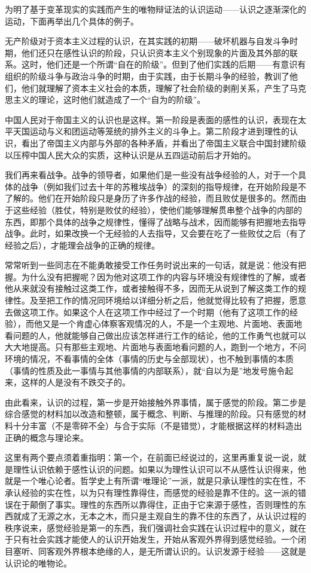 为明了基于变革现实的实践而产生的唯物辩证法的认识运动——认识之逐渐深化的运动，下面再举出几个具体的例子。

无产阶级对于资本主义过程的认识，在其实践的初期——破坏机器与自发斗争时期，他们还只在感性认识的阶段，只认识资本主义个别现象的片面及其外部的联系。这时，他们还是一个所谓“自在的阶级”。但到了他们实践的后期——有意识有组织的阶级斗争与政治斗争的时期，由于实践，由于长期斗争的经验，教训了他们，他们就理解了资本主义社会的本质，理解了社会阶级的剥削关系，产生了马克思主义的理论，这时他们就造成了一个“自为的阶级”。

中国人民对于帝国主义的认识也是这样。第一阶段是表面的感性的认识，表现在太平天国运动与义和团运动等笼统的排外主义的斗争上。第二阶段才进到理性的认识，看出了帝国主义内部与外部的各种矛盾，并看出了帝国主义联合中国封建阶级以压榨中国人民大众的实质，这种认识是从五四运动前后才开始的。

我们再来看战争。战争的领导者，如果他们是一些没有战争经验的人，对于一个具体的战争（例如我们过去十年的苏稚埃战争）的深刻的指导规律，在开始阶段是不了解的。他们在开始阶段只是身历了许多作战的经验，而且败仗是很多的。然而由于这些经验（胜仗，特别是败仗的经验），使他们能够理解贯串整个战争的内部的东西，即那个具体的战争之规律性，懂得了战略与战术，因而能够有把握地去指导战争。此时，如果改换一个无经验的人去指导，又会要在吃了一些败仗之后（有了经验之后），才能理会战争的正确的规律。

常常听到一些同志在不能勇敢接受工作任务时说出来的一句话，就是说：他没有把握。为什么没有把握呢？因为他对这项工作的内容与环境没有规律性的了解，或者他从来就没有接触过这类工作，或者接触得不多，因而无从说到了解这类工作的规律性。及至把工作的情况同环境给以详细分析之后，他就觉得比较有了把握，愿意去做这项工作。如果这个人在这项工作中经过了一个时期（他有了这项工作的经验），而他又是一个肯虚心体察客观情况的人，不是一个主观地、片面地、表面地看问题的人，他就能够自己做出应该怎样进行工作的结论，他的工作勇气也就可以大大地提高。只有那些主观地、片面地与表面地看问题的人，跑到一个地方，不问环境的情况，不看事情的全体（事情的历史与全部现状），也不触到事情的本质（事情的性质及此一事情与其他事情的内部联系），就“自以为是”地发号施令起来，这样的人是没有不跌交子的。

由此看来，认识的过程，第一步是开始接触外界事情，属于感觉的阶段。第二步是综合感觉的材料加以改造和整顿，属于概念、判断、与推理的阶段。只有感觉的材料十分丰富（不是零碎不全）与合于实际（不是错觉），才能根据这样的材料造出正确的概念与理论来。

这里有两个要点须着重指明：第一个，在前面已经说过的，这里再重复说一说，就是理性认识依赖于感性认识的问题。如果以为理性认识可以不从感性认识得来，他就是一个唯心论者。哲学史上有所谓“唯理论”一派，就是只承认理性的实在性，不承认经验的实在性，以为只有理性靠得住，而感觉的经验是靠不住的。这一派的错误在于颠倒了事实。理性的东西所以靠得住，正由于它来源于感性，否则理性的东西就成了无源之水，无本之木，而只是主观自生的靠不住的东西了，从认识过程的秩序说来，感觉经验是第一的东西，我们强调社会实践在认识过程中的意义，就在于只有社会实践才能使人的认识开始发生，开始从客观外界得到感觉经验。一个闭目塞听、同客观外界根本绝缘的人，是无所谓认识的。认识发源于经验——这就是认识论的唯物论。

